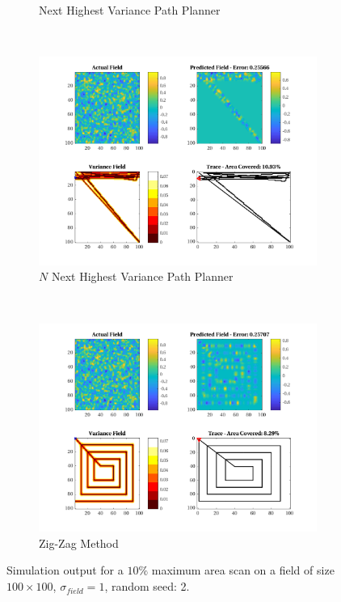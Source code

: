 \begin{figure}[htb!]
\begin{subfigure}[t]{0.5\textwidth}
        \captionsetup{skip=0.10\baselineskip,size=footnotesize}
        \caption{Next Highest Variance Path Planner}
    \end{subfigure}%
    \\
    \begin{subfigure}[t]{0.5\textwidth}
        \centering
        \includegraphics[width=\linewidth]{figures/hbresults/nnhv_10p_100x100_sf_1_seed_2.png}
        \captionsetup{skip=0.10\baselineskip,size=footnotesize}
        \caption{$N$ Next Highest Variance Path Planner}
    \end{subfigure}%
    ~
    \begin{subfigure}[t]{0.5\textwidth}
        \centering
        \includegraphics[width=\linewidth]{figures/hbresults/zz_10p_100x100_sf_1_seed_2.png}
        \captionsetup{skip=0.10\baselineskip,size=footnotesize}
        \caption{Zig-Zag Method}
    \end{subfigure}%
    \captionsetup{skip=0.20\baselineskip}
    \caption{Simulation output for a $10\%$ maximum area scan on a field of size $100 \times 100$, $\sigma_{field} = 1$, random seed: 2.}
    \label{fig:sim_sigma1_p10_s2}
\end{figure}

